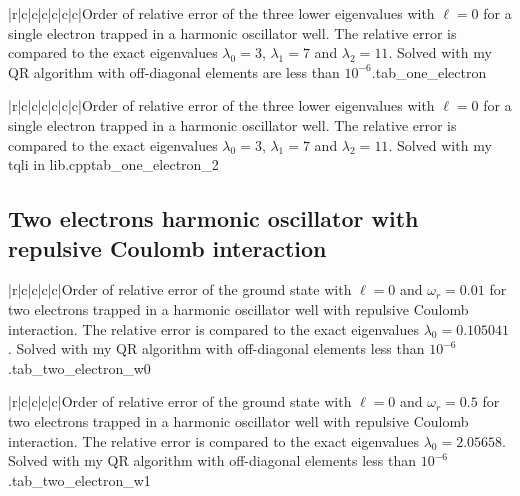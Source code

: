 \documentclass[11pt,english,a4paper]{article}
\begin{document}
\begin{flushleft}
\begin{tabell}{|r|c|c|c|c|c|c|}{\small}{}{}{Order of relative error of the three lower eigenvalues with $\ell = 0$ for a single electron trapped in a harmonic oscillator well. The relative error is compared to the exact eigenvalues  $\lambda_0 = 3$, $\lambda_1 = 7$ and $\lambda_2 = 11$. Solved with my QR algorithm with off-diagonal elements are less than $10^{-6}$.}{tab_one_electron}
\end{tabell}

\begin{tabell}{|r|c|c|c|c|c|c|}{\small}{}{}{Order of relative error of the three lower eigenvalues with $\ell = 0$ for a single electron trapped in a harmonic oscillator well. The relative error is compared to the exact eigenvalues  $\lambda_0 = 3$, $\lambda_1 = 7$ and $\lambda_2 = 11$. Solved with my tqli in lib.cpp}{tab_one_electron_2}
\end{tabell}

\subsection{Two electrons harmonic oscillator with repulsive Coulomb interaction}

\begin{tabell}{|r|c|c|c|c|}{\small}{}{}{Order of relative error of the ground state with $\ell = 0$ and $\omega_r = 0.01$ for two electrons trapped in a harmonic oscillator well with repulsive Coulomb interaction. The relative error is compared to the exact eigenvalues  $\lambda_0 = 0.105041$. Solved with my QR algorithm with off-diagonal elements less than $10^{-6}$.}{tab_two_electron_w0}
\end{tabell}

\begin{tabell}{|r|c|c|c|c|}{\small}{}{}{Order of relative error of the ground state with $\ell = 0$ and $\omega_r = 0.5$ for two electrons trapped in a harmonic oscillator well with repulsive Coulomb interaction. The relative error is compared to the exact eigenvalues  $\lambda_0 = 2.05658$. Solved with my QR algorithm with off-diagonal elements less than $10^{-6}$.}{tab_two_electron_w1}
\end{tabell}


\end{flushleft}
\end{document}
